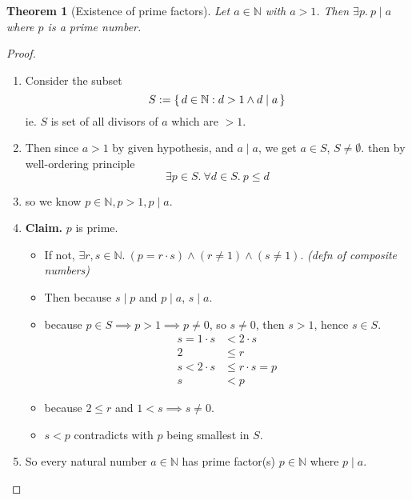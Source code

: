\documentclass[12pt]{article}
\newenvironment{prf}
{
    \begin{proof}
        \hfill
        \begin{enumerate}[label*=\arabic*.]
                }
                {
                \hfill\qedsymbol
        \end{enumerate}
    \renewcommand{\qedsymbol}{}
    \end{proof}
}
\newcounter{dummy} \numberwithin{dummy}{section}
\numberwithin{equation}{dummy}
\newtheorem{theorem}[dummy]{Theorem}
\theoremstyle{definition}
\newcommand{\nat}{\mathbb{N}}
\begin{document}
\begin{theorem}[Existence of prime factors]
    Let $a\in \nat$ with $a>1$. Then $\exists p.~ p\mid a$ where $p$ is a prime number.
\end{theorem}
\begin{prf}
\item Consider the subset
    $$S := \set{ d\in\nat: d>1 \land d\mid a}$$
    ie. $S$ is set of all divisors of $a$ which are $>1$.
\item Then since $a>1$ by given hypothesis, and $a\mid a$, we get $a\in S$, $S\ne \emptyset$.
    then by well-ordering principle
        $$\exists p\in S.~ \forall d\in S.~ p\leq d$$
\item so we know $p\in\nat, p>1, p\mid a$.
    \item[] \textbf{Claim.} $p$ is prime.
    \begin{itemize}
        \item If not, $\exists r,s\in\nat.~ (p = r\cdot s)\land(r\ne 1)\land(s\ne 1)$. \hfill\emph{(defn of composite numbers)}
        \item Then because $s\mid p$ and $p\mid a$, $s\mid a$.
        \item because $p\in S \implies p>1 \implies p\ne 0$, so $s\ne 0$, then $s>1$, hence $s\in S$.
            \begin{align*}
                s = 1\cdot s &< 2\cdot s\\
                2 &\leq r       \\
                s < 2\cdot s &\leq r\cdot s = p \\
                s &< p
            \end{align*}
        \item because $2\leq r$ and $1 < s\implies s\ne 0$.
        \item $s < p$ contradicts with $p$ being smallest in $S$.
    \end{itemize}
\item So every natural number $a\in\nat$ has prime factor(s) $p\in\nat$ where $p\mid a$.
\end{prf}
\end{document}
